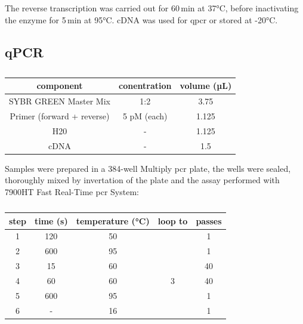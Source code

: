     The reverse transcription was carried out for 60\,min at 37°C, before inactivating the enzyme for 5\,min at 95°C. \ac{cDNA} was used for \ac{qpcr} or stored at -20°C.

    \subsection{qPCR}
    \begin{table}[h]
    \capstart
	\centering
	\begin{minipage}{\captionwidth}
	   	\caption[qPCR samples]{}
	   	\label{tab:qPCR_MM}
	\end{minipage}
    \begin{tabular}{|c|c|c|}
        \hline
        component                  & conentration & volume (µL) \\ \hline
        SYBR GREEN Master Mix      & 1:2          & 3.75        \\
        Primer (forward + reverse) & 5 pM (each)  & 1.125       \\
        H20                        & -            & 1.125       \\
        cDNA                       & -            & 1.5           \\ \hline
    \end{tabular}
    \end{table}
    Samples were prepared in a 384-well Multiply \ac{pcr} plate, the wells were sealed, thoroughly mixed by invertation of the plate and the assay performed with 7900HT Fast Real-Time \ac{pcr} System:

    \begin{table}[h]
    \capstart
    \centering
    \begin{minipage}{\captionwidth}
        \caption[qPCR programme]{}
        \label{tab:qPCR_programme}
    \end{minipage}
    \begin{tabular}{|c|c|c|c|c|}
    \hline
        step & time (s) & temperature (°C) & loop to & passes \\ \hline
        1    & 120      & 50               &         & 1      \\
        2    & 600      & 95               &         & 1      \\
        3    & 15       & 60               &         & 40     \\
        4    & 60       & 60               & 3       & 40     \\
        5    & 600      & 95               &         & 1      \\
        6    & -        & 16               &         & 1      \\ \hline
    \end{tabular}
    \end{table}

